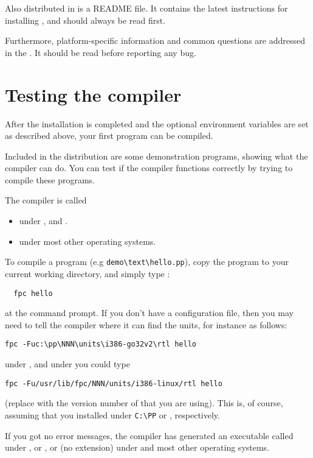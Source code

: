 Also distributed in \fpc is a README file. It contains the latest
instructions for installing \fpc, and should always be read first.

Furthermore, platform-specific information and common questions
are addressed in the . It should be read before reporting any
bug.


\section{Testing the compiler}

After the installation is completed and the optional environment variables
are set as described above, your first program can be compiled.

Included in the \fpc distribution are some demonstration programs,
showing what the compiler can do.
You can test if the compiler functions correctly by trying to compile
these programs.

The compiler is called
\begin{itemize}
\item {} under \windows, \ostwo and \dos.
\item {} under most other operating systems.
\end{itemize}
To compile a program (e.g \verb|demo\text\hello.pp|), copy the program
to your current working directory, and simply type :
\begin{verbatim}
  fpc hello
\end{verbatim}
at the command prompt. If you don't have a configuration file, then you may
need to tell the compiler where it can find the units, for instance as
follows:
\begin{verbatim}
fpc -Fuc:\pp\NNN\units\i386-go32v2\rtl hello
\end{verbatim}
under \dos, and under \linux you could type
\begin{verbatim}
fpc -Fu/usr/lib/fpc/NNN/units/i386-linux/rtl hello
\end{verbatim}
(replace  with the version number of \fpc that you are using).
This is, of course, assuming that you installed under \verb|C:\PP| or
, respectively.

If you got no error messages, the compiler has generated an executable
called  under \dos, \ostwo or \windows, or 
(no extension) under \unix and most other operating systems.

